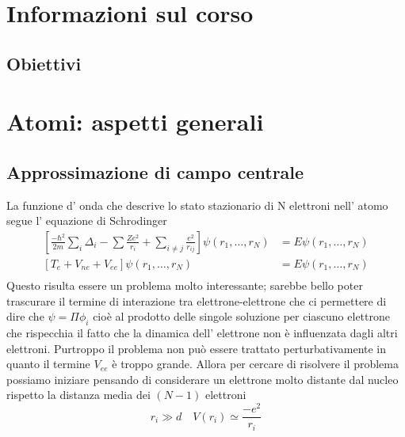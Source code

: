 \documentclass[11pt,a4paper]{article}
\title{\vspace{-0.2cm}\CourseName}
\author{\AuthorName \\ \small \University \\ \small \AcademicYear}
\date{\today}
\theoremstyle{springer}
\theoremstyle{definition}
\theoremstyle{remark}
\begin{document}
\maketitle
\vspace{-0.3cm}

\tableofcontents
\newpage


\section{Informazioni sul corso}
\subsection{Obiettivi}
\section{Atomi: aspetti generali}
\subsection{Approssimazione di campo centrale}
La funzione d' onda che descrive lo stato stazionario di N elettroni nell' atomo segue l' equazione di Schrodinger
\begin{align*}
  \left[ \frac{-\hbar^2}{2m}\sum_{i}\Delta_i -\sum \frac{Ze^2}{r_i}+ \sum_{i\neq j}\frac{e^2}{r_{ij}}\right] \psi(r_1,\dots,r_N) &= E \psi(r_1,\dots,r_N) \\
  \left[T_e + V_{ne}+V_{ee}\right] \psi(r_1,\dots,r_N) 
&= E \psi(r_1,\dots,r_N) \\
\end{align*}
Questo risulta essere un problema molto interessante; sarebbe bello poter trascurare il termine di interazione tra elettrone-elettrone che ci permettere di dire che $\psi = \Pi \phi_i$ cioè al prodotto delle singole soluzione per ciascuno elettrone che rispecchia il fatto che la dinamica dell' elettrone non è influenzata dagli altri elettroni. Purtroppo il problema non può essere trattato perturbativamente in quanto il termine $V_{ee}$ è troppo grande. Allora per cercare di risolvere il problema possiamo iniziare pensando di considerare un elettrone molto distante dal nucleo rispetto la distanza media dei $(N-1)$ elettroni
\begin{equation*}
  r_i \gg d \quad V(r_i) \simeq \frac{-e^2}{r_i}
\end{equation*}
\end{document}
